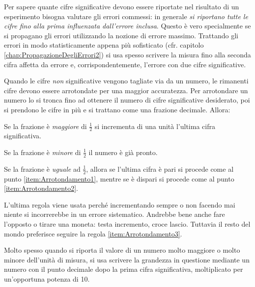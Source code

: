 \noindent Per sapere quante cifre significative devono essere riportate
nel risultato di un esperimento bisogna valutare gli errori commessi:
in generale {\itshape si riportano tutte le cifre fino alla prima influenzata
dall'errore inclusa}.
Questo \`e vero specialmente se si propagano gli errori utilizzando la nozione
di errore massimo.
Trattando gli errori in modo statisticamente appena pi\`u sofisticato
(cfr. capitolo \ref{chap:PropagazioneDegliErrori2}) si usa spesso
scrivere la misura fino alla seconda cifra affetta da errore e,
corrispondentemente, l'errore con due cifre significative.


Quando le cifre {\itshape non} significative vengono tagliate via da un
numero, le rimanenti cifre devono essere arrotondate per una maggior
accuratezza. Per arrotondare un numero lo si tronca fino ad ottenere il
numero di cifre significative desiderato, poi si prendono le cifre in pi\`u e
si trattano come una frazione decimale. Allora:
\begin{numlist}
\item{\label{item:Arrotondamento1}
Se la frazione \`e {\itshape maggiore} di $\frac{1}{2}$ si incrementa di
una unit\`a l'ultima cifra significativa.
}
\item{\label{item:Arrotondamento2}
Se la frazione \`e {\itshape minore} di $\frac{1}{2}$ il numero \`e gi\`a
pronto.
}
\item{\label{item:Arrotondamento3}
Se la frazione \`e {\itshape uguale} ad $\frac{1}{2}$, allora se l'ultima
cifra \`e pari si procede come al punto \ref{item:Arrotondamento1},
mentre se \`e dispari si procede come al punto \ref{item:Arrotondamento2}.
}
\end{numlist}
L'ultima regola viene usata perch\'e incrementando sempre o non facendo mai
niente si incorrerebbe in un errore sistematico.
Andrebbe bene anche fare l'opposto o tirare una moneta: testa incremento,
croce lascio. Tuttavia il resto del mondo preferisce seguire
la regola \ref{item:Arrotondamento3}.

Molto spesso quando si riporta il valore di un numero molto maggiore o molto
minore dell'unit\`a di misura, si usa scrivere la grandezza in questione
mediante un numero con il punto decimale dopo la prima cifra significativa,
moltiplicato per un'opportuna potenza di 10.

